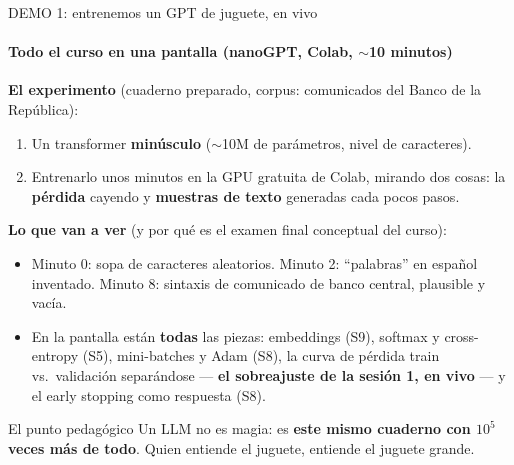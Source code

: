 \documentclass{beamer}
\newcommand{\1}{\mathbb{I}}
\begin{document}
\begin{frame}{DEMO 1: entrenemos un GPT de juguete, en vivo}
\framesubtitle{Todo el curso en una pantalla (nanoGPT, Colab, $\sim$10 minutos)}
\small
\textbf{El experimento} (cuaderno preparado, corpus: comunicados del Banco de la República):
\begin{enumerate}\itemsep3pt
  \item Un transformer \textbf{minúsculo} ($\sim$10M de parámetros, nivel de caracteres).
  \item Entrenarlo unos minutos en la GPU gratuita de Colab, mirando dos cosas: la \textbf{pérdida} cayendo y \textbf{muestras de texto} generadas cada pocos pasos.
\end{enumerate}
\pause

\vspace{0.15cm}
\textbf{Lo que van a ver} (y por qué es el examen final conceptual del curso):
\begin{itemize}\itemsep4pt
  \item Minuto 0: sopa de caracteres aleatorios. Minuto 2: ``palabras'' en español inventado. Minuto 8: sintaxis de comunicado de banco central, plausible y vacía. \pause
  \item En la pantalla están \textbf{todas} las piezas: embeddings (S9), softmax y cross-entropy (S5), mini-batches y Adam (S8), la curva de pérdida train vs.\ validación separándose --- \textbf{el sobreajuste de la sesión 1, en vivo} --- y el early stopping como respuesta (S8). \pause
\end{itemize}

\begin{block}{El punto pedagógico}
Un LLM no es magia: es \textbf{este mismo cuaderno con $10^5$ veces más de todo}. Quien entiende el juguete, entiende el juguete grande.
\end{block}
\end{frame}
\end{document}
